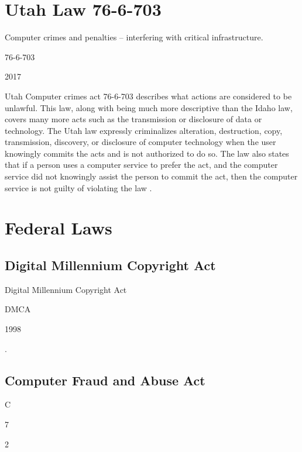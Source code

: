 \documentclass[14pt]{article}
\begin{document}
\section{Utah Law 76-6-703}
    \begin{description}[leftmargin=!, labelwidth=\widthof{\bfseries Year Approved}]
        \item [Name] Computer crimes and penalties -- interfering with critical infrastructure.
        \item [Abbreviation] 76-6-703
        \item [Year Approved] 2017
        \item [Description] Utah Computer crimes act 76-6-703 describes what actions are considered to be unlawful. This law, along with being much more descriptive than the Idaho law, covers many more acts such as the transmission or disclosure of data or technology. The Utah law expressly criminalizes alteration, destruction, copy, transmission, discovery, or disclosure of computer technology when the user knowingly commits the acts and is not authorized to do so. The law also states that if a person uses a computer service to prefer the act, and the computer service did not knowingly assist the person to commit the act, then the computer service is not guilty of violating the law \cite{Utah766703}.
    \end{description}

\section{Federal Laws}
\subsection{Digital Millennium Copyright Act}
    \begin{description}[leftmargin=!, labelwidth=\widthof{\bfseries Year Approved}]
        \item [Name] Digital Millennium Copyright Act
        \item [Abbreviation] DMCA
        \item [Year Approved] 1998
        \item [Description]  \cite{DMCA}.
    \end{description}
\subsection{Computer Fraud and Abuse Act}
    \begin{description}[leftmargin=!, labelwidth=\widthof{\bfseries Year Approved}]
        \item [Name] C
        \item [Abbreviation] 7
        \item [Year Approved] 2
        \item [Description] \cite{CFAA}
    \end{description}
\end{document}
